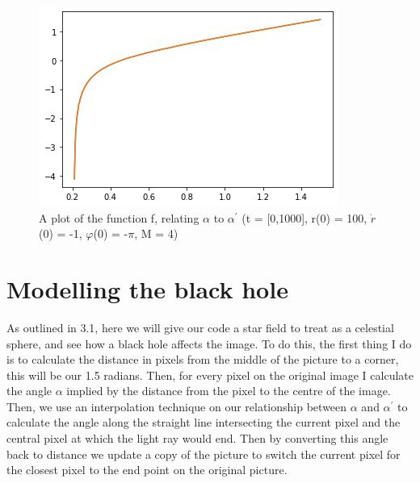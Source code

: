 \documentclass[oneside,openright,frontopenright]{dmathesis}
\begin{document}
\begin{figure}
	\centering
	\begin{minipage}[b]{0.6\textwidth}
		\includegraphics[width=\textwidth]{img/alpha-prime_f(alpha)}
		\caption{A plot of the function f, relating $\alpha$ to $\alpha^{'}$ (t = [0,1000], r(0) = 100, $\dot{r}$(0) = -1, $\varphi$(0) = -$\pi$, M = 4)}
	\end{minipage}
\end{figure}

\section{Modelling the black hole}
	
	As outlined in 3.1, here we will give our code a star field to treat as a celestial sphere, and see how a black hole affects the image. To do this, the first thing I do is to calculate the distance in pixels from the middle of the picture to a corner, this will be our 1.5 radians. Then, for every pixel on the original image I calculate the angle $\alpha$ implied by the distance from the pixel to the centre of the image. Then, we use an interpolation technique on our relationship between $\alpha$ and $\alpha^{'}$ to calculate the angle along the straight line intersecting the current pixel and the central pixel at which the light ray would end. Then by converting this angle back to distance we update a copy of the picture to switch the current pixel for the closest pixel to the end point on the original picture.
\end{document}
